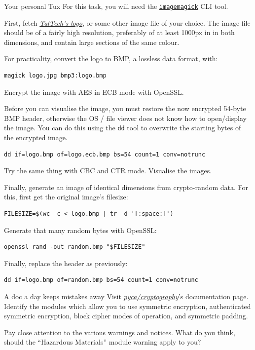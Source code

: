 \documentclass{practice}
\begin{document}
\begin{task}{Your personal Tux}
  For this task, you will need the \href{https://imagemagick.org/}{\texttt{imagemagick}} CLI tool.

  First, fetch \href{https://taltech.ee/brand}{\textit{TalTech's logo}}, or some other image file of your choice.
  The image file should be of a fairly high resolution, preferably of at least 1000px in in both dimensions, and contain large sections of the same colour.

  For practicality, convert the logo to BMP, a lossless data format, with:
  \begin{Verbatim}
magick logo.jpg bmp3:logo.bmp
  \end{Verbatim}

  Encrypt the image with AES in ECB mode with OpenSSL.

  Before you can visualise the image, you must restore the now encrypted 54-byte BMP header, otherwise the OS / file viewer does not know how to open/display the image.
  You can do this using the \texttt{dd} tool to overwrite the starting bytes of the encrypted image.
  \begin{Verbatim}
dd if=logo.bmp of=logo.ecb.bmp bs=54 count=1 conv=notrunc
  \end{Verbatim}

  Try the same thing with CBC and CTR mode.
  Visualise the images.

  Finally, generate an image of identical dimensions from crypto-random data.
  For this, first get the original image's filesize:
  \begin{Verbatim}
FILESIZE=$(wc -c < logo.bmp | tr -d '[:space:]')
  \end{Verbatim}

  Generate that many random bytes with OpenSSL:
  \begin{Verbatim}
openssl rand -out random.bmp "$FILESIZE"
  \end{Verbatim}

  Finally, replace the header as previously:
  \begin{Verbatim}
dd if=logo.bmp of=random.bmp bs=54 count=1 conv=notrunc
  \end{Verbatim}
\end{task}

\begin{task}{A doc a day keeps mistakes away}
  Visit \href{https://cryptography.io/en/latest/}{\textit{pyca/cryptography}}'s documentation page.
  Identify the modules which allow you to use symmetric encryption, authenticated symmetric encryption, block cipher modes of operation, and symmetric padding.

  Pay close attention to the various warnings and notices.
  What do you think, should the \enquote{Hazardous Materials} module warning apply to you?
\end{task}
\end{document}
